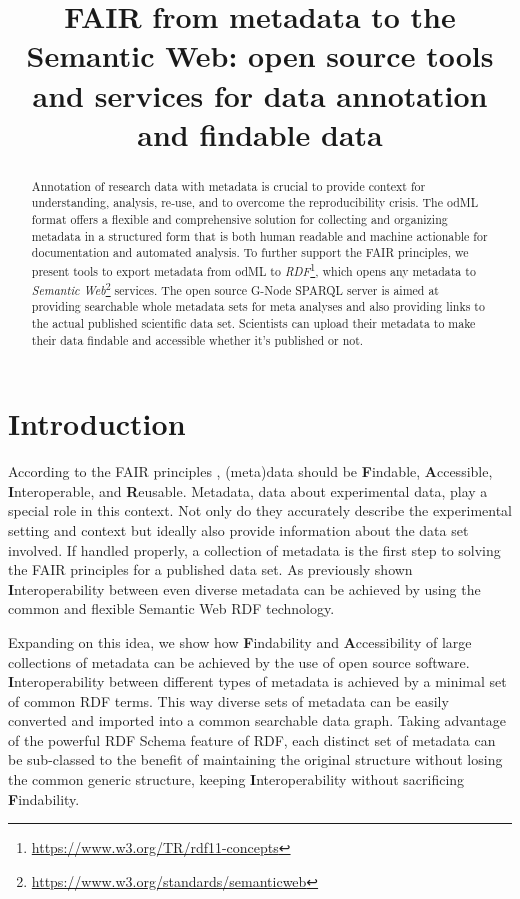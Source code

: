 \documentclass{article}
\title{FAIR from metadata to the Semantic Web: open source tools and services for data annotation and findable data}
\newcommand{\findablility}{\textbf{F}indability}
\newcommand{\findable}{\textbf{F}indable}
\newcommand{\accessibility}{\textbf{A}ccessibility}
\newcommand{\accessible}{\textbf{A}ccessible}
\newcommand{\interoperability}{\textbf{I}nteroperability}
\newcommand{\interoperable}{\textbf{I}nteroperable}
\begin{document}
\maketitle

\begin{abstract}
Annotation of research data with metadata is crucial to provide context for understanding, analysis, re-use, and to overcome the reproducibility crisis. The odML format offers a flexible and comprehensive solution for collecting and organizing metadata in a structured form that is both human readable and machine actionable for documentation and automated analysis. To further support the FAIR principles, we present tools to export metadata from odML to \textit{RDF}\footnote{\url{https://www.w3.org/TR/rdf11-concepts}}, which opens any metadata to \textit{Semantic Web}\footnote{\url{https://www.w3.org/standards/semanticweb}} services. The open source G-Node SPARQL server is aimed at providing searchable whole metadata sets for meta analyses and also providing links to the actual published scientific data set. Scientists can upload their metadata to make their data findable and accessible whether it's published or not.
\end{abstract}

\section{Introduction} \label{sec:introduction}
According to the FAIR principles \cite{Wilkinson_2016}, (meta)data should be \findable{}, \accessible{}, \interoperable{}, and \textbf{R}eusable. Metadata, data about experimental data, play a special role in this context. Not only do they accurately describe the experimental setting and context but ideally also provide information about the data set involved. If handled properly, a collection of metadata is the first step to solving the FAIR principles for a published data set. As previously shown \cite{Teeters_2017} \interoperability{} between even diverse metadata can be achieved by using the common and flexible Semantic Web RDF technology.

Expanding on this idea, we show how \findablility{} and \accessibility{} of large collections of metadata can be achieved by the use of open source software. \interoperability{} between different types of metadata is achieved by a minimal set of common RDF terms. This way diverse sets of metadata can be easily converted and imported into a common searchable data graph. Taking advantage of the powerful RDF Schema feature of RDF, each distinct set of metadata can be sub-classed to the benefit of maintaining the original structure without losing the common generic structure, keeping \interoperability{} without sacrificing \findablility{}.
\end{document}
